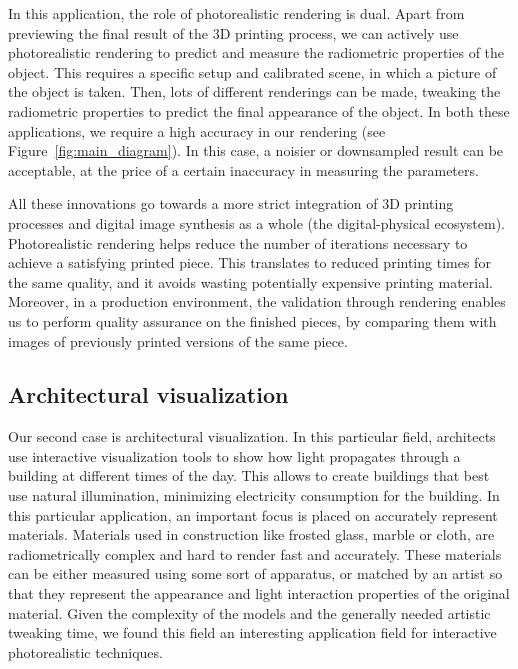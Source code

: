 In this application, the role of photorealistic rendering is dual. Apart from previewing the final result of the 3D printing process,   we can actively use photorealistic rendering to predict and measure the radiometric properties of the object. This requires a  specific setup and calibrated scene, in which a picture of the object is taken. Then, lots of different renderings can be made, tweaking the radiometric properties to predict the final appearance of the object. In both these applications, we require a high accuracy in our rendering (see Figure~\ref{fig:main_diagram}). In this case, a noisier or downsampled result can be acceptable, at the price of a certain inaccuracy in measuring the parameters. 

All these innovations go towards a more strict integration of 3D printing processes and digital image synthesis as a whole (the digital-physical ecosystem). Photorealistic rendering helps reduce the number of iterations necessary to achieve a satisfying printed piece. This translates to reduced printing times for the same quality, and it avoids wasting potentially expensive printing material. Moreover, in a production environment, the validation through rendering enables us to perform quality assurance on the finished pieces, by comparing them with images of previously printed versions of the same piece.


\subsection{Architectural visualization}

Our second case is architectural visualization. In this particular field, architects use interactive visualization tools to show how light propagates through a building at different times of the day. This allows to create buildings that best use natural illumination, minimizing electricity consumption for the building. In this particular application, an important focus is placed on accurately represent materials. Materials used in construction like frosted glass, marble or cloth, are radiometrically complex and hard to render fast and accurately. These materials can be either measured using some sort of apparatus, or matched by an artist so that they represent the appearance and light interaction properties of the original material. Given the complexity of the models and the generally needed artistic tweaking time, we found this field an interesting application field for interactive photorealistic techniques.

